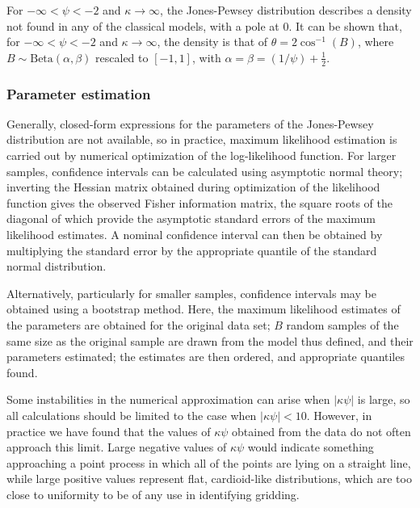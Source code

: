 \documentclass[../../ArchStats.tex]{subfiles}
\begin{document}
For $-\infty < \psi < -2$ and $\kappa \rightarrow \infty$, the Jones-Pewsey distribution describes a density not found in any of the classical models, with a pole at 0. It can be shown that, for $-\infty < \psi < -2$ and $\kappa \rightarrow \infty$, the density is that of $\theta = 2 \cos^{-1}(B)$, where $B \sim \text{Beta}(\alpha, \beta)$ rescaled to  $[-1,1]$, with $\alpha = \beta = (1/\psi) + \frac{1}{2}$.


\subsubsection{Parameter estimation}

Generally, closed-form expressions for the parameters of the Jones-Pewsey distribution are not available, so in practice, maximum likelihood estimation is carried out by numerical optimization of the log-likelihood function. For larger samples, confidence intervals can be calculated using asymptotic normal theory; inverting the Hessian matrix obtained during optimization of the likelihood function gives the observed Fisher information matrix, the square roots of the diagonal of which provide the asymptotic standard errors of the maximum likelihood estimates. A nominal confidence interval can then be obtained by multiplying the standard error by the appropriate quantile of the standard normal distribution.

Alternatively, particularly for smaller samples, confidence intervals may be obtained using a bootstrap method. Here, the maximum likelihood estimates of the parameters are obtained for the original data set; $B$ random samples of the same size as the original sample are drawn from the model thus defined, and their parameters estimated; the estimates are then ordered, and appropriate quantiles found.

Some instabilities in the numerical approximation can arise when $\vert \kappa \psi \vert$ is large, so all calculations should be limited to the case when $\vert \kappa \psi \vert < 10$. However, in practice we have found that the values of $\kappa \psi$ obtained from the data do not often approach this limit. Large negative values of $\kappa \psi$ would indicate something approaching a point process in which all of the points are lying on a straight line, while large positive values represent flat, cardioid-like distributions, which are too close to uniformity to be of any use in identifying gridding.
\end{document}
